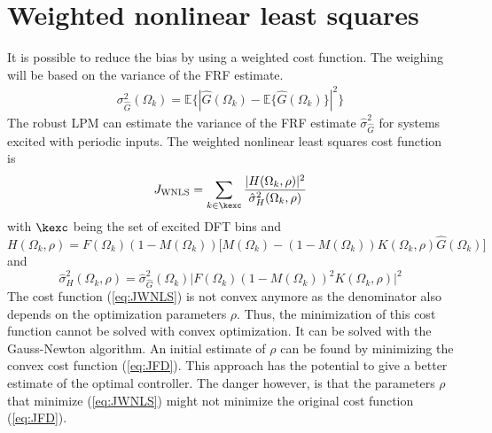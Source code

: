 \section{Weighted nonlinear least squares}
It is possible to reduce the bias by using a weighted cost function. The weighing will be based on the variance of the FRF estimate.
\begin{align*}
    \sigma^2_{\hat G}(\Omega_k) = \mathbb{E}\big\{|\hat G(\Omega_k)- \mathbb{E}\{\hat G(\Omega_k)\}|^2\big\} 
\end{align*}
The robust LPM can estimate the variance of the FRF estimate $\hat\sigma^2_{\hat G}$ for systems excited with periodic inputs. The weighted nonlinear least squares cost function is
\begin{equation}
    J_\mathrm{WNLS} = \sum_{k \in \kexc} \frac{|H(\Omega_k,\rho)|^2}{\hat\sigma^2_{H}(\Omega_k,\rho)}
    \label{eq:JWNLS}
\end{equation}
with $\kexc$ being the set of excited DFT bins and
\begin{equation*}
    H(\Omega_k,\rho) = F(\Omega_k)(1-M(\Omega_k)) \Big[M(\Omega_k)-(1-M(\Omega_k))K(\Omega_k,\rho) \hat{G}(\Omega_k)\Big]
\end{equation*}
and
\begin{equation*}
\hat\sigma^2_{H}(\Omega_k,\rho) = \hat\sigma^2_{\hat G}(\Omega_k) \Big| F(\Omega_k) (1-M(\Omega_k))^2K(\Omega_k,\rho) \Big|^2
\end{equation*}
The cost function (\ref{eq:JWNLS}) is not convex anymore as the denominator also depends on the optimization parameters $\rho$. Thus, the minimization of this cost function cannot be solved with convex optimization. It can be solved with the Gauss-Newton algorithm. An initial estimate of $\rho$ can be found by minimizing the convex cost function (\ref{eq:JFD}). This approach has the potential to give a better estimate of the optimal controller. The danger however, is that the parameters $\rho$ that minimize (\ref{eq:JWNLS}) might not minimize the original cost function (\ref{eq:JFD}).


